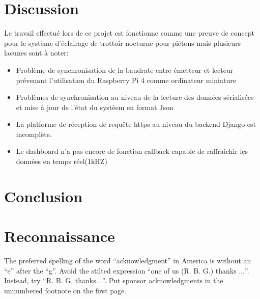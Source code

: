 \documentclass[journal]{IEEEtran}
\begin{document}
\section{Discussion}
Le travail effectué lors de ce projet est fonctionne comme une preuve de concept pour le système d'éclairage de trottoir nocturne pour piétons mais plusieurs lacunes sont à noter:
\begin{itemize}
    \item Problème de synchronisation de la baudrate entre émetteur et lecteur prévenant l'utilisation du Raspberry Pi 4 comme ordinateur miniature
    \item Problèmes de synchronisation au niveau de la lecture des données sérialisées et mise à jour de l'état du systèem en format Json
    \item La platforme de réception de requête https au niveau du backend Django est incomplète.
    \item Le dashboard n'a pas encore de fonction callback capable de raffraichir les données en temps réel(1kHZ)  
\end{itemize}

\section{Conclusion}

\section*{Reconnaissance}

The preferred spelling of the word ``acknowledgment'' in America is without 
an ``e'' after the ``g''. Avoid the stilted expression ``one of us (R. B. 
G.) thanks $\ldots$''. Instead, try ``R. B. G. thanks$\ldots$''. Put sponsor 
acknowledgments in the unnumbered footnote on the first page.
\end{document}
